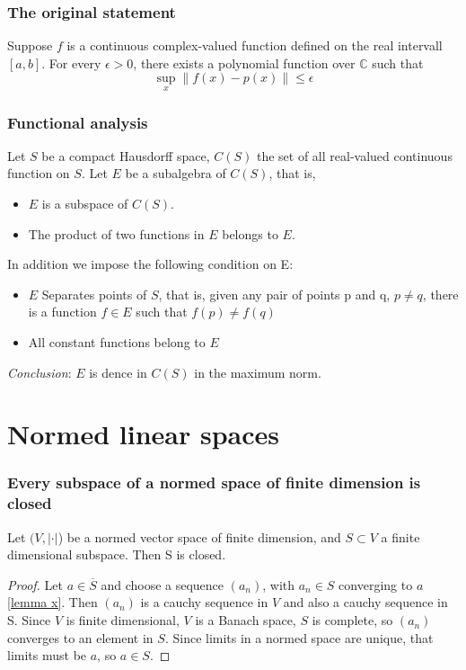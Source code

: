 \documentclass[titlepage]{article}
\begin{document}
\subsubsection{The original statement}
Suppose $f$ is a continuous complex-valued function defined on the real intervall $[a,b]$. For every $\epsilon>0$, there exists a polynomial function over $\mathbb{C}$ such that 
\begin{equation}
\sup_x\| f(x) - p(x)\| \leq \epsilon
\end{equation}
\subsubsection{Functional analysis}
Let $S$ be a compact Hausdorff space, $C(S)$ the set of all real-valued continuous function on $S$. Let $E$ be a subalgebra of $C(S)$, that is,
\begin{itemize}
\item $E$ is a subspace of $C(S)$.
\item The product of two functions in $E$ belongs to $E$.
\end{itemize}
In addition we impose the following condition on E:
\begin{itemize}
\item $E$ Separates points of $S$, that is, given any pair of points p and q, $p\neq q$, there is a function $f\in E$ such that $f(p) \neq f(q)$
\item All constant functions belong to $E$
\end{itemize}
\textit{Conclusion}: $E$ is dence in $C(S)$ in the maximum norm.

\newpage
\section{Normed linear spaces}
\subsubsection{Every subspace of a normed space of finite dimension is closed}
Let $(V, |\cdot|$) be a normed vector space of finite dimension, and $S\subset V$ a finite dimensional subspace. Then S is closed.
\begin{proof}
Let $a\in \overline{S}$ and choose a sequence $(a_n)$, with $a_n \in S$ converging to $a$ \ref{lemma x}. Then $(a_n)$ is a cauchy sequence in $V$ and also a cauchy sequence in S. Since $V$ is finite dimensional, $V$ is a Banach space, $S$ is complete, so $(a_n)$ converges to an element in $S$. Since limits in a normed space are unique, that limits must be $a$, so $a\in S$.
\end{proof}
\end{document}
